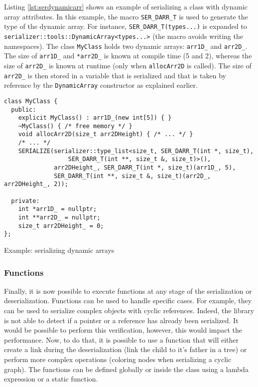 Listing \ref{lst:serdynamicarr} shows an example of serializing a class with
dynamic array attributes. In this example, the macro \texttt{SER\_DARR\_T} is
used to generate the type of the dynamic array. For instance,
\texttt{SER\_DARR\_T(types...)} is expanded to
\texttt{serializer::tools::DynamicArray<types...>} (the macro avoids writing
the namespaces). The class \texttt{MyClass} holds two dynamic arrays:
\texttt{arr1D\_} and \texttt{arr2D\_}. The size of \texttt{arr1D\_} and
\texttt{*arr2D\_} is known at compile time (5 and 2), whereas the size of
\texttt{arr2D\_} is known at runtime (only when \texttt{allocArr2D} is called).
The size of \texttt{arr2D\_} is then stored in a variable that is serialized and
that is taken by reference by the \texttt{DynamicArray} constructor as explained
earlier.

\begin{listing}[ht!]
\begin{verbatim}
class MyClass {
  public:
    explicit MyClass() : arr1D_(new int[5]) { }
    ~MyClass() { /* free memory */ }
    void allocArr2D(size_t arr2DHeight) { /* ... */ }
    /* ... */
    SERIALIZE(serializer::type_list<size_t, SER_DARR_T(int *, size_t),
                  SER_DARR_T(int **, size_t &, size_t)>(),
              arr2DHeight_, SER_DARR_T(int *, size_t)(arr1D_, 5),
              SER_DARR_T(int **, size_t &, size_t)(arr2D_, arr2DHeight_, 2));

  private:
    int *arr1D_ = nullptr;
    int **arr2D_ = nullptr;
    size_t arr2DHeight_ = 0;
};
\end{verbatim}
\caption{Example: serializing dynamic arrays}
\label{lst:serdynamicarr}
\end{listing}

\subsubsection{Functions}
\label{sec:serfun}

Finally, it is now possible to execute functions at any stage of the
serialization or deserialization. Functions can be used to handle specific
cases. For example, they can be used to serialize complex objects with cyclic
references. Indeed, the library is not able to detect if a pointer or a
reference has already been serialized. It would be possible to perform this
verification, however, this would impact the performance. Now, to do that, it
is possible to use a function that will either create a link during the
deserialization (link the child to it's father in a tree) or perform more
complex operations (coloring nodes when serializing a cyclic graph). The
functions can be defined globally or inside the class using a lambda expression
or a static function.

